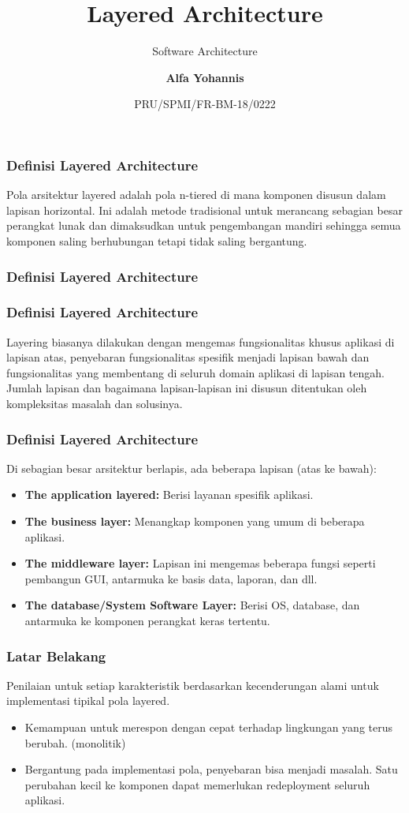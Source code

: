 \documentclass[aspectratio=169, table]{beamer}
\subtitle{Software Architecture}
\title{\vskip-0.7cm \Large Layered Architecture}
\date[Serial]{\scriptsize {PRU/SPMI/FR-BM-18/0222}}
\author[Pradita]{\small {\textbf{Alfa Yohannis}}}
\begin{document}
	
	\frame{\titlepage}
	
	\begin{frame}
		\frametitle{Definisi Layered Architecture}
		Pola arsitektur layered adalah pola n-tiered di mana komponen disusun dalam lapisan horizontal. Ini adalah metode tradisional untuk merancang sebagian besar perangkat lunak dan dimaksudkan untuk pengembangan mandiri sehingga semua komponen saling berhubungan tetapi tidak saling bergantung.
	\end{frame}
	
	\begin{frame}
		\frametitle{Definisi Layered Architecture}
	\end{frame}
	
	\begin{frame}
		\frametitle{Definisi Layered Architecture}
		Layering biasanya dilakukan dengan mengemas fungsionalitas khusus aplikasi di lapisan atas, penyebaran fungsionalitas spesifik menjadi lapisan bawah dan fungsionalitas yang membentang di seluruh domain aplikasi di lapisan tengah. Jumlah lapisan dan bagaimana lapisan-lapisan ini disusun ditentukan oleh kompleksitas masalah dan solusinya.
	\end{frame}
	
	\begin{frame}
		\frametitle{Definisi Layered Architecture}
		Di sebagian besar arsitektur berlapis, ada beberapa lapisan (atas ke bawah):
		\begin{itemize}
			\item \textbf{The application layered:} Berisi layanan spesifik aplikasi.
			\item \textbf{The business layer:} Menangkap komponen yang umum di beberapa aplikasi.
			\item \textbf{The middleware layer:} Lapisan ini mengemas beberapa fungsi seperti pembangun GUI, antarmuka ke basis data, laporan, dan dll.
			\item \textbf{The database/System Software Layer:} Berisi OS, database, dan antarmuka ke komponen perangkat keras tertentu.
		\end{itemize}
	\end{frame}
	
	\begin{frame}
		\frametitle{Latar Belakang}
		Penilaian untuk setiap karakteristik berdasarkan kecenderungan alami untuk implementasi tipikal pola layered.
		\begin{itemize}
			\item Kemampuan untuk merespon dengan cepat terhadap lingkungan yang terus berubah. (monolitik)
			\item Bergantung pada implementasi pola, penyebaran bisa menjadi masalah. Satu perubahan kecil ke komponen dapat memerlukan redeployment seluruh aplikasi.
		
		\end{itemize}
	\end{frame}
	
\end{document}
